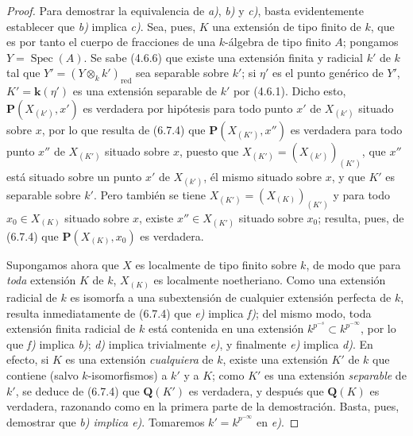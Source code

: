 \begin{proof}
Para demostrar la equivalencia de \emph{a)}, \emph{b)} y \emph{c)}, basta evidentemente establecer
que \emph{b)} implica \emph{c)}. Sea, pues, $K$ una extensión de tipo finito de $k$, que es
por tanto el cuerpo de fracciones de una $k$-álgebra de tipo finito $A$; pongamos
$Y=\operatorname{Spec}(A)$. Se sabe (4.6.6) que existe una extensión finita
y radicial $k'$ de $k$ tal que $Y'=(Y\otimes_k k')_{\mathrm{red}}$ sea
separable sobre $k'$; si $\eta'$ es el punto genérico de $Y'$, $K'=\boldsymbol{k}(\eta')$
es una extensión separable de $k'$ por (4.6.1). Dicho esto,
$\boldsymbol{P}(X_{(k')},x')$ es verdadera por hipótesis para todo punto $x'$ de $X_{(k')}$
situado sobre $x$, por lo que resulta de (6.7.4) que $\boldsymbol{P}(X_{(K')},x'')$ es
verdadera para todo punto $x''$ de $X_{(K')}$ situado sobre $x$, puesto que
$X_{(K')}=(X_{(k')})_{(K')}$, que $x''$ está situado sobre un punto $x'$ de
$X_{(k')}$, él mismo situado sobre $x$, y que $K'$ es separable sobre $k'$.
Pero también se tiene
$X_{(K')}=(X_{(K)})_{(K')}$ y para todo $x_0\in X_{(K)}$ situado sobre
$x$, existe $x''\in X_{(K')}$ situado sobre $x_0$; resulta, pues, de
(6.7.4) que $\boldsymbol{P}(X_{(K)},x_0)$ es verdadera.

Supongamos ahora que $X$ es localmente de tipo finito sobre $k$, de modo que
para \emph{toda} extensión $K$ de $k$, $X_{(K)}$ es localmente noetheriano. Como una
extensión radicial de $k$ es isomorfa a una subextensión de cualquier extensión
perfecta de $k$, resulta inmediatamente de (6.7.4) que \emph{e)} implica \emph{f)}; del mismo
modo, toda extensión finita radicial de $k$ está contenida en una extensión
$k^{p^{-s}}\subset k^{p^{-\infty}}$, por lo que \emph{f)} implica \emph{b)}; \emph{d)} implica
trivialmente \emph{e)}, y finalmente \emph{e)} implica \emph{d)}. En efecto, si $K$ es una extensión
\emph{cualquiera} de $k$,
existe una extensión $K'$ de $k$ que contiene (salvo $k$-isomorfismos) a
$k'$ y a $K$; como $K'$ es una extensión \emph{separable} de $k'$, se deduce de (6.7.4)
que $\boldsymbol{Q}(K')$ es verdadera, y después que $\boldsymbol{Q}(K)$ es verdadera, razonando como en la
primera parte de la demostración. Basta, pues, demostrar que \emph{b) implica
e)}. Tomaremos $k'=k^{p^{-\infty}}$ en \emph{e)}.


\end{proof}
